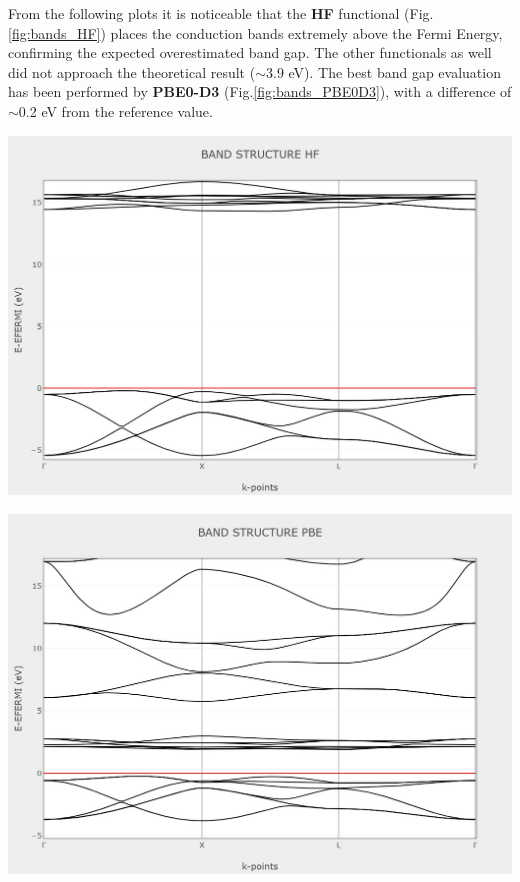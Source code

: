 \documentclass{article}
\begin{document}
From the following plots it is noticeable that the \textbf{HF} functional (Fig.\ref{fig:bands_HF}) places the conduction bands extremely above the Fermi Energy, confirming the expected overestimated band gap. The other functionals as well did not approach the theoretical result ($\sim$3.9 eV). The best band gap evaluation has been performed by \textbf{PBE0-D3} (Fig.\ref{fig:bands_PBE0D3}), with a difference of $\sim$0.2 eV from the reference value.

\vspace{15pt}

\noindent\begin{minipage}{0.45\textwidth}
	\centering
	\includegraphics[width=1\textwidth]{../images/BANDS/BAND_STRUCTURE_HF.jpeg}
    \label{fig:bands_HF}
\end{minipage}
\hfill
\begin{minipage}{0.45\textwidth}
	\centering
	\includegraphics[width=1\textwidth]{../images/BANDS/BAND_STRUCTURE_PBE.jpeg}
    \label{fig:bands_PBE}
\end{minipage}
\end{document}
